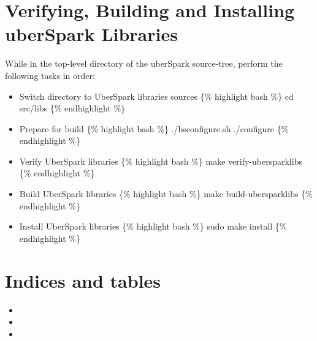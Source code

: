 \documentclass[letterpaper,10pt,english]{sphinxmanual}
\begin{document}
\chapter{Verifying, Building and Installing uberSpark Libraries}
\label{\detokenize{verify-build-install-libs:verifying-building-and-installing-uberspark-libraries}}\label{\detokenize{verify-build-install-libs::doc}}
While in the top-level directory of the uberSpark source-tree, perform
the following tasks in order:
\begin{itemize}
\item {} 
Switch directory to UberSpark libraries sources \{\% highlight bash \%\}
cd src/libs \{\% endhighlight \%\}

\item {} 
Prepare for build \{\% highlight bash \%\} ./bsconfigure.sh ./configure
\{\% endhighlight \%\}

\item {} 
Verify UberSpark libraries \{\% highlight bash \%\} make
verify-ubersparklibs \{\% endhighlight \%\}

\item {} 
Build UberSpark libraries \{\% highlight bash \%\} make
build-ubersparklibs \{\% endhighlight \%\}

\item {} 
Install UberSpark libraries \{\% highlight bash \%\} sudo make install \{\%
endhighlight \%\}

\end{itemize}




\chapter{Indices and tables}
\label{\detokenize{index:indices-and-tables}}\begin{itemize}
\item {} 

\item {} 

\item {} 

\end{itemize}



\renewcommand{\indexname}{Index}
\printindex
\end{document}

